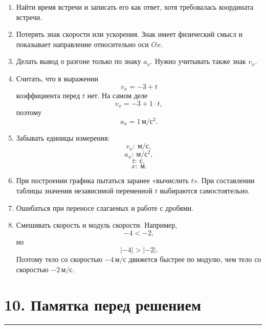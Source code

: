 \documentclass[a4paper,12pt]{article}
\newcommand{\sectionline}{%
  \par\vspace{-0.5em}%
  \noindent\textcolor{accent}{\rule{\linewidth}{0.7pt}}%
  \par\vspace{0.5em}%
}
\begin{document}
\begin{enumerate}
  \item Найти время встречи и записать его как ответ, хотя требовалась координата встречи.

  \item Потерять знак скорости или ускорения. Знак имеет физический смысл и показывает направление относительно оси \(Ox\).

  \item Делать вывод о разгоне только по знаку \(a_x\). Нужно учитывать также знак \(v_x\).

  \item Считать, что в выражении
  \[
    v_x=-3+t
  \]
  коэффициента перед \(t\) нет. На самом деле
  \[
    v_x=-3+1\cdot t,
  \]
  поэтому
  \[
    a_x=1\,\text{м}/\text{с}^2.
  \]

  \item Забывать единицы измерения:
  \[
    v_x:\ \text{м}/\text{с},
  \]
  \[
    a_x:\ \text{м}/\text{с}^2,
  \]
  \[
    t:\ \text{с},
  \]
  \[
    x:\ \text{м}.
  \]

  \item При построении графика пытаться заранее «вычислить \(t\)». При составлении таблицы значения независимой переменной \(t\) выбираются самостоятельно.

  \item Ошибаться при переносе слагаемых и работе с дробями.

  \item Смешивать скорость и модуль скорости. Например,
  \[
    -4<-2,
  \]
  но
  \[
    |-4|>|-2|.
  \]
  Поэтому тело со скоростью \(-4\,\text{м}/\text{с}\) движется быстрее по модулю, чем тело со скоростью \(-2\,\text{м}/\text{с}\).
\end{enumerate}


\section*{10. Памятка перед решением}
\sectionline
\end{document}
